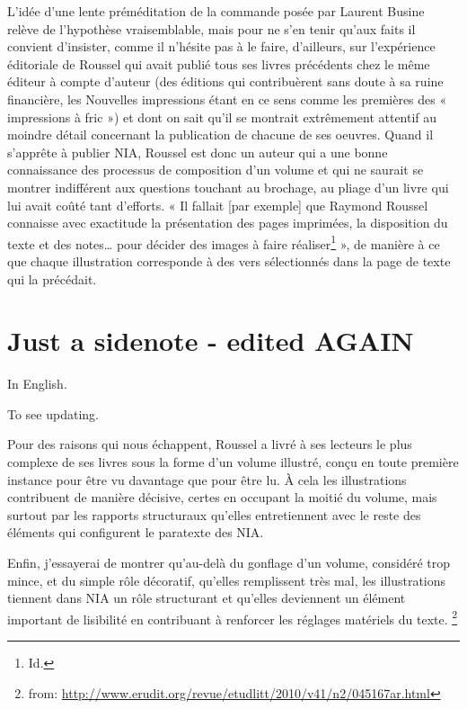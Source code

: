 \documentclass[nofonts]{tufte-handout}
\begin{document}
L’idée d’une lente préméditation de la commande posée par Laurent Busine relève de l’hypothèse vraisemblable, mais pour ne s’en tenir qu’aux faits il convient d’insister, comme il n’hésite pas à le faire, d’ailleurs, sur l’expérience éditoriale de Roussel qui avait publié tous ses livres précédents chez le même éditeur à compte d’auteur (des éditions qui contribuèrent sans doute à sa ruine financière, les Nouvelles impressions étant en ce sens comme les premières des « impressions à fric ») et dont on sait qu’il se montrait extrêmement attentif au moindre détail concernant la publication de chacune de ses oeuvres. Quand il s’apprête à publier NIA, Roussel est donc un auteur qui a une bonne connaissance des processus de composition d’un volume et qui ne saurait se montrer indifférent aux questions touchant au brochage, au pliage d’un livre qui lui avait coûté tant d’efforts. « Il fallait [par exemple] que Raymond Roussel connaisse avec exactitude la présentation des pages imprimées, la disposition du texte et des notes… pour décider des images à faire réaliser\footnote{Id.} », de manière à ce que chaque illustration corresponde à des vers sélectionnés dans la page de texte qui la précédait.
\section{Just a sidenote - edited AGAIN}
\label{sec-2}

In English.

To see updating.

Pour des raisons qui nous échappent, Roussel a livré à ses lecteurs le plus complexe de ses livres sous la forme d’un volume illustré, conçu en toute première instance pour être vu davantage que pour être lu. À cela les illustrations contribuent de manière décisive, certes en occupant la moitié du volume, mais surtout par les rapports structuraux qu’elles entretiennent avec le reste des éléments qui configurent le paratexte des NIA.

Enfin, j’essayerai de montrer qu’au-delà du gonflage d’un volume, considéré trop mince, et du simple rôle décoratif, qu’elles remplissent très mal, les illustrations tiennent dans NIA un rôle structurant et qu’elles deviennent un élément important de lisibilité en contribuant à renforcer les réglages matériels du texte. \footnote{from: \url{http://www.erudit.org/revue/etudlitt/2010/v41/n2/045167ar.html}}
\end{document}
